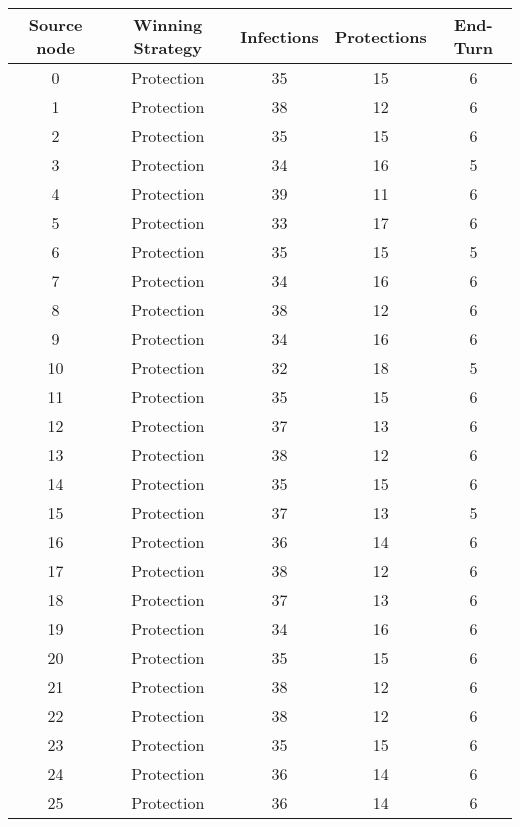 \documentclass[results.tex]{subfiles}
\begin{document}
\begin{center}
  \begin{tabular}{| c || c | c | c | c |}
    \hline
    {\bfseries Source node} & {\bfseries Winning Strategy} & {\bfseries Infections} & {\bfseries Protections} & {\bfseries End-Turn} \\  %
    \hline\hline
    0 & Protection & 35 & 15 & 6 \\ 
    \hline
    1 & Protection & 38 & 12 & 6 \\ 
    \hline
    2 & Protection & 35 & 15 & 6 \\ 
    \hline
    3 & Protection & 34 & 16 & 5 \\ 
    \hline
    4 & Protection & 39 & 11 & 6 \\ 
    \hline
    5 & Protection & 33 & 17 & 6 \\ 
    \hline
    6 & Protection & 35 & 15 & 5 \\ 
    \hline
    7 & Protection & 34 & 16 & 6 \\ 
    \hline
    8 & Protection & 38 & 12 & 6 \\ 
    \hline
    9 & Protection & 34 & 16 & 6 \\ 
    \hline
    10 & Protection & 32 & 18 & 5 \\ 
    \hline
    11 & Protection & 35 & 15 & 6 \\ 
    \hline
    12 & Protection & 37 & 13 & 6 \\ 
    \hline
    13 & Protection & 38 & 12 & 6 \\ 
    \hline
    14 & Protection & 35 & 15 & 6 \\ 
    \hline
    15 & Protection & 37 & 13 & 5 \\ 
    \hline
    16 & Protection & 36 & 14 & 6 \\ 
    \hline
    17 & Protection & 38 & 12 & 6 \\ 
    \hline
    18 & Protection & 37 & 13 & 6 \\ 
    \hline
    19 & Protection & 34 & 16 & 6 \\ 
    \hline
    20 & Protection & 35 & 15 & 6 \\ 
    \hline
    21 & Protection & 38 & 12 & 6 \\ 
    \hline
    22 & Protection & 38 & 12 & 6 \\ 
    \hline
    23 & Protection & 35 & 15 & 6 \\ 
    \hline
    24 & Protection & 36 & 14 & 6 \\ 
    \hline
    25 & Protection & 36 & 14 & 6 \\ 

\end{tabular}
\end{center}
\end{document}
